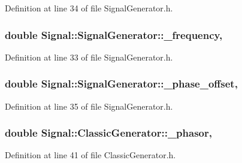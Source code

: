 Definition at line 34 of file Signal\+Generator.\+h.

\hypertarget{class_signal_1_1_signal_generator_a7f107461333bce68c5dad412db96a8c2}{
\subsubsection[{\+\_\+frequency}]{\setlength{\rightskip}{0pt plus 5cm}double Signal\+::\+Signal\+Generator\+::\+\_\+frequency\hspace{0.3cm}{\ttfamily [protected]}, {\ttfamily [inherited]}}}\label{class_signal_1_1_signal_generator_a7f107461333bce68c5dad412db96a8c2}


Definition at line 33 of file Signal\+Generator.\+h.

\hypertarget{class_signal_1_1_signal_generator_a6b4444d46747c8517171edbbf4b5588f}{
\subsubsection[{\+\_\+phase\+\_\+offset}]{\setlength{\rightskip}{0pt plus 5cm}double Signal\+::\+Signal\+Generator\+::\+\_\+phase\+\_\+offset\hspace{0.3cm}{\ttfamily [protected]}, {\ttfamily [inherited]}}}\label{class_signal_1_1_signal_generator_a6b4444d46747c8517171edbbf4b5588f}


Definition at line 35 of file Signal\+Generator.\+h.

\hypertarget{class_signal_1_1_classic_generator_ade9b66bc49d2d2f40a1390fc6374b8b2}{
\subsubsection[{\+\_\+phasor}]{\setlength{\rightskip}{0pt plus 5cm}double Signal\+::\+Classic\+Generator\+::\+\_\+phasor\hspace{0.3cm}{\ttfamily [protected]}, {\ttfamily [inherited]}}}\label{class_signal_1_1_classic_generator_ade9b66bc49d2d2f40a1390fc6374b8b2}


Definition at line 41 of file Classic\+Generator.\+h.

